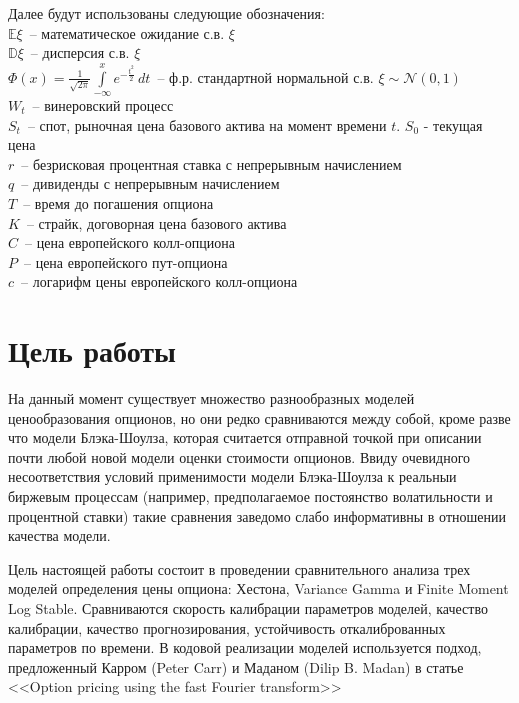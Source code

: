 \documentclass[oneside, final, 12pt]{article}
\begin{document}
\newpage
\tableofcontents

\newpage
\large
{}
\leftline{\hrulefill}
\vskip0.25cm
\normalfont

Далее будут использованы следующие обозначения:\\
$\mathbb{E}\xi$~-- математическое ожидание с.в. $\xi$\\
$\mathbb{D}\xi$~-- дисперсия с.в. $\xi$\\
$\displaystyle \Phi(x)=\frac{1}{\sqrt{2\pi}}\int\limits_{-\infty}^{x}e^{-\frac{t^2}{2}}\,dt$~-- ф.р. стандартной нормальной с.в. \( \xi \sim \mathcal{N}(0, 1)\) \\
$W_t$~-- винеровский процесс\\
$S_t$~-- спот, рыночная цена базового актива на момент времени $t$. $S_0$ - текущая цена\\
$r$~-- безрисковая процентная ставка с непрерывным начислением\\
$q$~-- дивиденды с непрерывным начислением\\
$T$~-- время до погашения опциона\\
$K$~-- страйк, договорная цена базового актива\\
$C$~-- цена европейского колл-опциона\\
$P$~-- цена европейского пут-опциона\\
$c$~-- логарифм цены европейского колл-опциона

\newpage
\section{Цель работы}
На данный момент существует множество разнообразных моделей ценообразования опционов, но они редко сравниваются между собой, кроме разве что модели Блэка-Шоулза, которая считается отправной точкой при описании почти любой новой модели оценки стоимости опционов. Ввиду очевидного несоответствия условий применимости модели Блэка-Шоулза к реальныи биржевым процессам (например, предполагаемое постоянство волатильности и процентной ставки) такие сравнения заведомо слабо информативны в отношении качества модели. \par

Цель настоящей работы состоит в проведении сравнительного анализа трех моделей определения цены опциона: Хестона, Variance Gamma и Finite Moment Log Stable. Сравниваются скорость калибрации параметров моделей, качество калибрации, качество прогнозирования, устойчивость откалиброванных параметров по времени. В кодовой реализации моделей используется подход, предложенный Карром (Peter Carr) и Маданом (Dilip B. Madan) в статье <<Option pricing using the fast Fourier transform>>\cite{FFT:paper}
\end{document}
